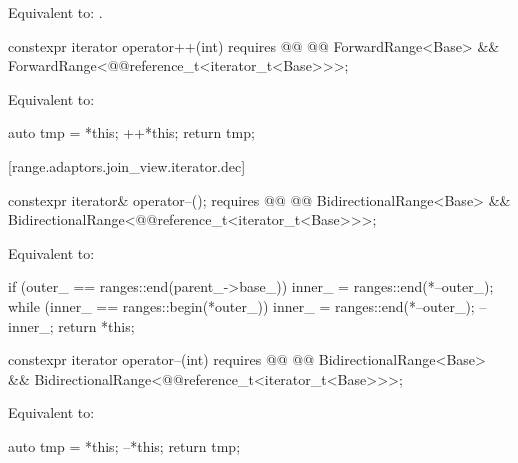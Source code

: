 {\begin{itemdescr}
\pnum
\effects Equivalent to: .
\end{itemdescr}

\begin{itemdecl}
constexpr iterator operator++(int)
  requires @@
    @@ ForwardRange<Base> &&
    ForwardRange<@@reference_t<iterator_t<Base>>>;
\end{itemdecl}

\begin{itemdescr}
\pnum
\effects Equivalent to:
\begin{codeblock}
auto tmp = *this;
++*this;
return tmp;
\end{codeblock}
\end{itemdescr}

[range.adaptors.join_view.iterator.dec]{}

\begin{itemdecl}
constexpr iterator& operator--();
  requires @@
    @@ BidirectionalRange<Base> &&
    BidirectionalRange<@@reference_t<iterator_t<Base>>>;
\end{itemdecl}

\begin{itemdescr}
\pnum
\effects Equivalent to:
\begin{codeblock}
if (outer_ == ranges::end(parent_->base_))
  inner_ = ranges::end(*--outer_);
while (inner_ == ranges::begin(*outer_))
  inner_ = ranges::end(*--outer_);
--inner_;
return *this;
\end{codeblock}
\end{itemdescr}

\begin{itemdecl}
constexpr iterator operator--(int)
  requires @@
    @@ BidirectionalRange<Base> &&
    BidirectionalRange<@@reference_t<iterator_t<Base>>>;
\end{itemdecl}

\begin{itemdescr}
\pnum
\effects Equivalent to:
\begin{codeblock}
auto tmp = *this;
--*this;
return tmp;
\end{codeblock}
\end{itemdescr}

}
